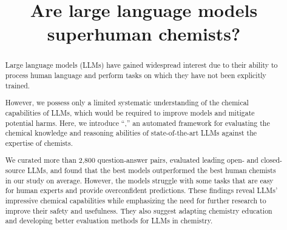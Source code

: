 \documentclass[11pt, oneside]{article}
\title{\textsf{Are large language models superhuman chemists?}}
\begin{document}
\maketitle

\clearpage
\begin{abstract}
Large language models (LLMs) have gained widespread interest due to their ability to process human language and perform tasks on which they have not been explicitly trained.

However, we possess only a limited systematic understanding of the chemical capabilities of LLMs, which would be required to improve models and mitigate potential harms.
Here, we introduce \enquote{\chembench,} an automated framework for evaluating the chemical knowledge and reasoning abilities of state-of-the-art LLMs against the expertise of chemists.

We curated more than 2,800 question-answer pairs, evaluated leading open- and closed-source LLMs, and found that the best models outperformed the best human chemists in our study on average.
However, the models struggle with some tasks that are easy for human experts and provide overconfident predictions.
These findings reveal LLMs' impressive chemical capabilities while emphasizing the need for further research to improve their safety and usefulness. They also suggest adapting chemistry education and developing better evaluation methods for LLMs in chemistry.
\end{abstract}
\end{document}
